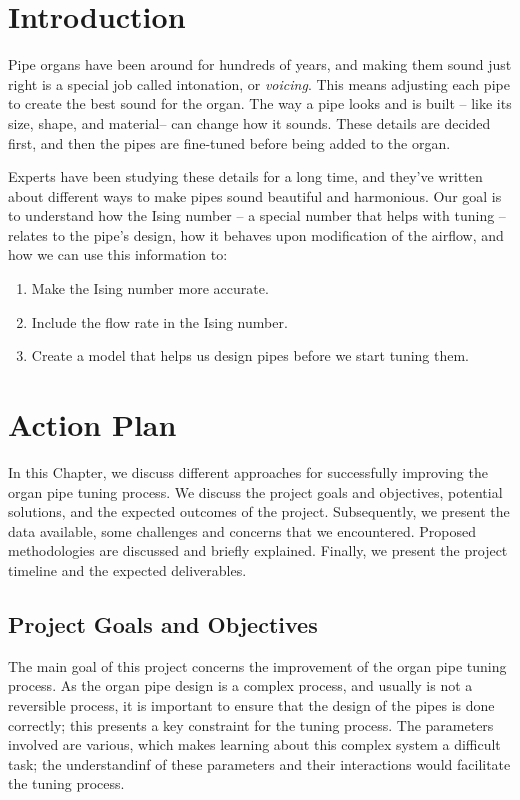 \documentclass{psu-plan}
\begin{document}
\tableofcontents


\section{Introduction}

Pipe organs have been around for hundreds of years, and making them sound just
right is a special job called intonation, or \emph{voicing}.
This means adjusting each pipe to create the best sound for the organ.
The way a pipe looks and is built -- like its size, shape, and material-- can
change how it sounds.
These details are decided first, and then the pipes are fine-tuned before being
added to the organ.

Experts have been studying these details for a long time, and they’ve written
about different ways to make pipes sound beautiful and harmonious.
Our goal is to understand how the Ising number -- a special number that helps
with tuning -- relates to the pipe’s design, how it behaves upon modification of
the airflow, and how we can use this information to:
\begin{enumerate}
    \item Make the Ising number more accurate.
    \item Include the flow rate in the Ising number.
    \item Create a model that helps us design pipes before we start tuning them.
\end{enumerate}

\section{Action Plan}

In this Chapter, we discuss different approaches for successfully improving the
organ pipe tuning process.
We discuss the project goals and objectives, potential solutions, and the
expected outcomes of the project.
Subsequently, we present the data available, some challenges and concerns that
we encountered.
Proposed methodologies are discussed and briefly explained.
Finally, we present the project timeline and the expected deliverables.

\subsection{Project Goals and Objectives}

The main goal of this project concerns the improvement of the organ pipe tuning
process.
As the organ pipe design is a complex process, and usually is not a reversible
process, it is important to ensure that the design of the pipes is done
correctly; this presents a key constraint for the tuning process.
The parameters involved are various, which makes learning about this complex
system a difficult task; the understandinf of these parameters and their
interactions would facilitate the tuning process.
\end{document}
